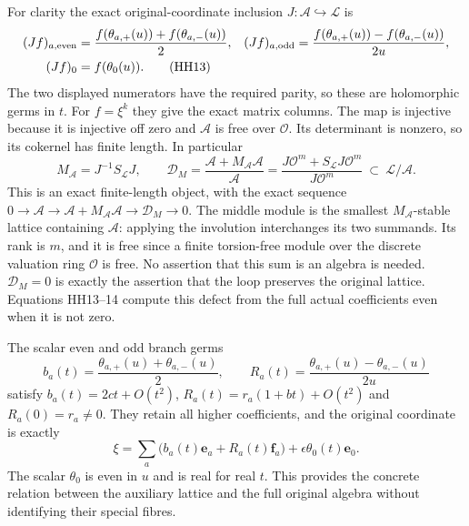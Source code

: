 For clarity the exact original-coordinate inclusion
$J:\mathcal A\hookrightarrow\mathcal L$ is
\begin{align}
 (Jf)_{a,\mathrm{even}}&=
   \frac{f(\theta_{a,+}(u))+f(\theta_{a,-}(u))}{2},&
 (Jf)_{a,\mathrm{odd}}&=
   \frac{f(\theta_{a,+}(u))-f(\theta_{a,-}(u))}{2u},\notag\\
 (Jf)_0&=f(\theta_0(u)).
 \tag{HH13}\label{hh:inclusion}
\end{align}
The two displayed numerators have the required parity, so these
are holomorphic germs in $t$. For $f=\xi^k$ they give the exact
matrix columns. The map is injective because it is injective off
zero and $\mathcal A$ is free over $\mathcal O$. Its determinant is
nonzero, so its cokernel has finite length. In particular
\[
 M_{\mathcal A}=J^{-1}S_{\mathcal L}J,\qquad
 \mathcal D_M=
   \frac{\mathcal A+M_{\mathcal A}\mathcal A}{\mathcal A}
   =\frac{J\mathcal O^m+S_{\mathcal L}J\mathcal O^m}
          {J\mathcal O^m}
   \ \subset\ \mathcal L/\mathcal A .
 \tag{HH14}\label{hh:lattice-defect}
\]
This is an exact finite-length object, with the exact sequence
$0\to\mathcal A\to\mathcal A+M_{\mathcal A}\mathcal A
\to\mathcal D_M\to0$.
The middle module is the smallest $M_{\mathcal A}$-stable lattice
containing $\mathcal A$: applying the involution interchanges its two
summands. Its rank is $m$, and it is free since a finite torsion-free
module over the discrete valuation ring $\mathcal O$ is free.
No assertion that this sum is an algebra is needed.
$\mathcal D_M=0$ is exactly the assertion that the loop preserves
the original lattice. Equations HH13--14 compute this defect from
the full actual coefficients even when it is not zero.

The scalar even and odd branch germs
\[
 b_a(t)=\frac{\theta_{a,+}(u)+\theta_{a,-}(u)}2,\qquad
 R_a(t)=\frac{\theta_{a,+}(u)-\theta_{a,-}(u)}{2u}
 \tag{HH15}
\]
satisfy $b_a(t)=2ct+O(t^2)$,
$R_a(t)=r_a(1+bt)+O(t^2)$ and $R_a(0)=r_a\ne0$.
They retain all higher coefficients, and the original coordinate is
exactly
\[
 \xi=\sum_a\bigl(b_a(t)\mathbf e_a+R_a(t)\mathbf f_a\bigr)
                     +\epsilon\theta_0(t)\mathbf e_0 .
 \tag{HH16}\label{hh:coordinate}
\]
The scalar $\theta_0$ is even in $u$ and is real for real $t$.
This provides the concrete relation between the auxiliary lattice
and the full original algebra without identifying their special fibres.

